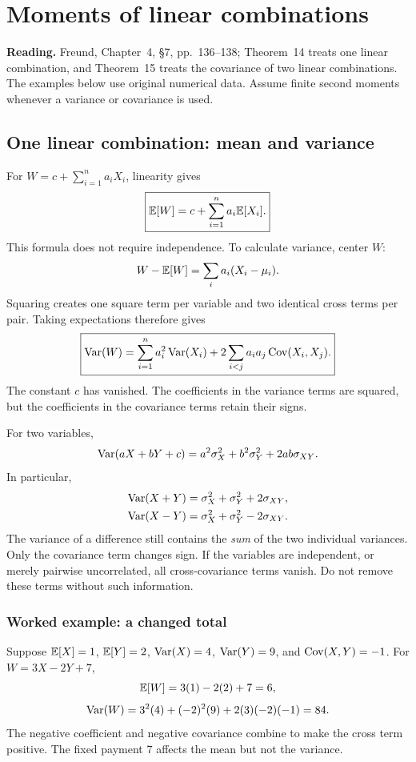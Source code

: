 \section{Moments of linear combinations}
\label{sec:linear}
\noindent\textbf{Reading.} Freund, Chapter~4, \S7, pp.~136--138; Theorem~14 treats one linear combination, and Theorem~15 treats the covariance of two linear combinations. The examples below use original numerical data. Assume finite second moments whenever a variance or covariance is used.

\subsection{One linear combination: mean and variance}
For $W=c+\sum_{i=1}^n a_iX_i$, linearity gives
\[
 \boxed{\mathbb E[W]=c+\sum_{i=1}^n a_i\mathbb E[X_i].}
\]
This formula does not require independence. To calculate variance, center $W$:
\[
 W-\mathbb E[W]=\sum_i a_i(X_i-\mu_i).
\]
Squaring creates one square term per variable and two identical cross terms per pair. Taking expectations therefore gives
\[
\boxed{\operatorname{Var}(W)=\sum_{i=1}^n a_i^2\operatorname{Var}(X_i)
 +2\sum_{i<j}a_i a_j\operatorname{Cov}(X_i,X_j).}
\]
The constant $c$ has vanished. The coefficients in the variance terms are squared, but the coefficients in the covariance terms retain their signs.

For two variables,
\[
 \operatorname{Var}(aX+bY+c)=a^2\sigma_X^2+b^2\sigma_Y^2+2ab\sigma_{XY}.
\]
In particular,
\[
\begin{aligned}
 \operatorname{Var}(X+Y)&=\sigma_X^2+\sigma_Y^2+2\sigma_{XY},\\
 \operatorname{Var}(X-Y)&=\sigma_X^2+\sigma_Y^2-2\sigma_{XY}.
\end{aligned}
\]
The variance of a difference still contains the \emph{sum} of the two individual variances. Only the covariance term changes sign. If the variables are independent, or merely pairwise uncorrelated, all cross-covariance terms vanish. Do not remove these terms without such information.

\subsubsection*{Worked example: a changed total}
Suppose $\mathbb E[X]=1$, $\mathbb E[Y]=2$, $\operatorname{Var}(X)=4$, $\operatorname{Var}(Y)=9$, and $\operatorname{Cov}(X,Y)=-1$. For $W=3X-2Y+7$,
\[
 \mathbb E[W]=3(1)-2(2)+7=6,
\]
\[
 \operatorname{Var}(W)=3^2(4)+(-2)^2(9)+2(3)(-2)(-1)=84.
\]
The negative coefficient and negative covariance combine to make the cross term positive. The fixed payment $7$ affects the mean but not the variance.

